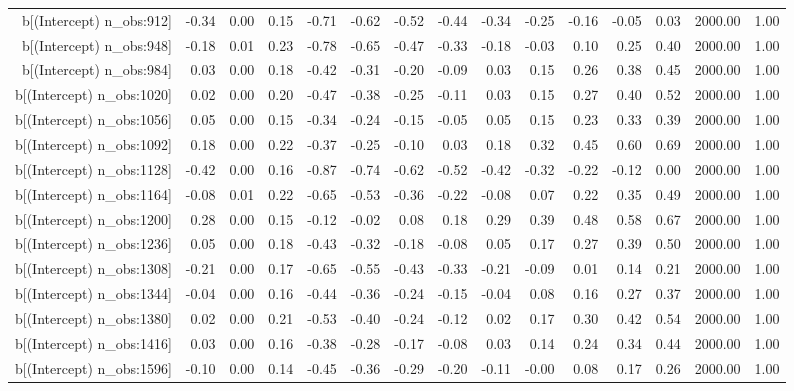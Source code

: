 \begin{table}[ht]
\begin{tabular}{rrrrrrrrrrrrrrr}
  b[(Intercept) n\_obs:912] & -0.34 & 0.00 & 0.15 & -0.71 & -0.62 & -0.52 & -0.44 & -0.34 & -0.25 & -0.16 & -0.05 & 0.03 & 2000.00 & 1.00 \\ 
  b[(Intercept) n\_obs:948] & -0.18 & 0.01 & 0.23 & -0.78 & -0.65 & -0.47 & -0.33 & -0.18 & -0.03 & 0.10 & 0.25 & 0.40 & 2000.00 & 1.00 \\ 
  b[(Intercept) n\_obs:984] & 0.03 & 0.00 & 0.18 & -0.42 & -0.31 & -0.20 & -0.09 & 0.03 & 0.15 & 0.26 & 0.38 & 0.45 & 2000.00 & 1.00 \\ 
  b[(Intercept) n\_obs:1020] & 0.02 & 0.00 & 0.20 & -0.47 & -0.38 & -0.25 & -0.11 & 0.03 & 0.15 & 0.27 & 0.40 & 0.52 & 2000.00 & 1.00 \\ 
  b[(Intercept) n\_obs:1056] & 0.05 & 0.00 & 0.15 & -0.34 & -0.24 & -0.15 & -0.05 & 0.05 & 0.15 & 0.23 & 0.33 & 0.39 & 2000.00 & 1.00 \\ 
  b[(Intercept) n\_obs:1092] & 0.18 & 0.00 & 0.22 & -0.37 & -0.25 & -0.10 & 0.03 & 0.18 & 0.32 & 0.45 & 0.60 & 0.69 & 2000.00 & 1.00 \\ 
  b[(Intercept) n\_obs:1128] & -0.42 & 0.00 & 0.16 & -0.87 & -0.74 & -0.62 & -0.52 & -0.42 & -0.32 & -0.22 & -0.12 & 0.00 & 2000.00 & 1.00 \\ 
  b[(Intercept) n\_obs:1164] & -0.08 & 0.01 & 0.22 & -0.65 & -0.53 & -0.36 & -0.22 & -0.08 & 0.07 & 0.22 & 0.35 & 0.49 & 2000.00 & 1.00 \\ 
  b[(Intercept) n\_obs:1200] & 0.28 & 0.00 & 0.15 & -0.12 & -0.02 & 0.08 & 0.18 & 0.29 & 0.39 & 0.48 & 0.58 & 0.67 & 2000.00 & 1.00 \\ 
  b[(Intercept) n\_obs:1236] & 0.05 & 0.00 & 0.18 & -0.43 & -0.32 & -0.18 & -0.08 & 0.05 & 0.17 & 0.27 & 0.39 & 0.50 & 2000.00 & 1.00 \\ 
  b[(Intercept) n\_obs:1308] & -0.21 & 0.00 & 0.17 & -0.65 & -0.55 & -0.43 & -0.33 & -0.21 & -0.09 & 0.01 & 0.14 & 0.21 & 2000.00 & 1.00 \\ 
  b[(Intercept) n\_obs:1344] & -0.04 & 0.00 & 0.16 & -0.44 & -0.36 & -0.24 & -0.15 & -0.04 & 0.08 & 0.16 & 0.27 & 0.37 & 2000.00 & 1.00 \\ 
  b[(Intercept) n\_obs:1380] & 0.02 & 0.00 & 0.21 & -0.53 & -0.40 & -0.24 & -0.12 & 0.02 & 0.17 & 0.30 & 0.42 & 0.54 & 2000.00 & 1.00 \\ 
  b[(Intercept) n\_obs:1416] & 0.03 & 0.00 & 0.16 & -0.38 & -0.28 & -0.17 & -0.08 & 0.03 & 0.14 & 0.24 & 0.34 & 0.44 & 2000.00 & 1.00 \\ 
  b[(Intercept) n\_obs:1596] & -0.10 & 0.00 & 0.14 & -0.45 & -0.36 & -0.29 & -0.20 & -0.11 & -0.00 & 0.08 & 0.17 & 0.26 & 2000.00 & 1.00 \\ 

\end{tabular}
\end{table}
